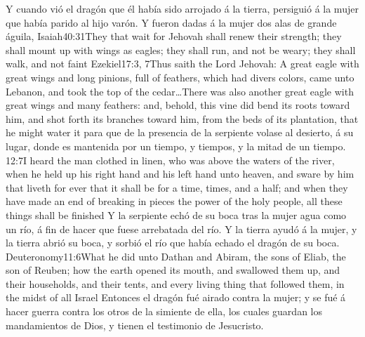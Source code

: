 Y cuando vió el dragón que él había sido arrojado á la tierra, persiguió á la mujer que había parido al hijo varón.
Y fueron dadas á la mujer dos alas de grande águila,%
				   {Isaiah}{40:31}{They that wait for Jehovah shall renew their strength; they shall mount up with wings as eagles; they shall run, and not be weary; they shall walk, and not faint}%
				   {Ezekiel}{17:3, 7}{Thus saith the Lord Jehovah: A great eagle with great wings and long pinions, full of feathers, which had divers colors, came unto Lebanon, and took the top of the cedar\ldots There was also another great eagle with great wings and many feathers: and, behold, this vine did bend its roots toward him, and shot forth its branches toward him, from the beds of its plantation, that he might water it}
 para que de la presencia de la serpiente volase al desierto, á su lugar, donde es mantenida por un tiempo, y tiempos, y la mitad de un tiempo.%
				    {12:7}{I heard the man clothed in linen, who was above the waters of the river, when he held up his right hand and his left hand unto heaven, and sware by him that liveth for ever that it shall be for a time, times, and a half; and when they have made an end of breaking in pieces the power of the holy people, all these things shall be finished}
Y la serpiente echó de su boca tras la mujer agua como un río, á fin de hacer que fuese arrebatada del río. 
Y la tierra ayudó á la mujer, y la tierra abrió su boca, y sorbió el río que había echado el dragón de su boca.%
				  {Deuteronomy}{11:6}{What he did unto Dathan and Abiram, the sons of Eliab, the son of Reuben; how the earth opened its mouth, and swallowed them up, and their households, and their tents, and every living thing that followed them, in the midst of all Israel}
Entonces el dragón fué airado contra la mujer; y se fué á hacer guerra contra los otros de la simiente de ella, los cuales guardan los mandamientos de Dios, y tienen el testimonio de Jesucristo.%

